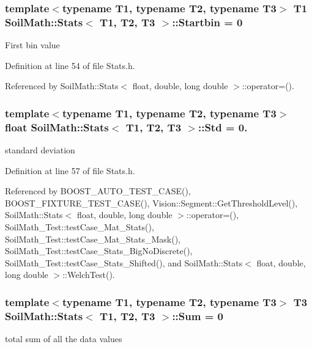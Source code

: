 \subsubsection[{Startbin}]{\setlength{\rightskip}{0pt plus 5cm}template$<$typename T1, typename T2, typename T3$>$ T1 {\bf Soil\+Math\+::\+Stats}$<$ T1, T2, T3 $>$\+::Startbin = 0}\label{class_soil_math_1_1_stats_acf54f4a105482109ebc884c8e56d0ba9}
First bin value 

Definition at line 54 of file Stats.\+h.



Referenced by Soil\+Math\+::\+Stats$<$ float, double, long double $>$\+::operator=().

\hypertarget{class_soil_math_1_1_stats_a6af590b7d033d882d5428c0d7a1f5e59}{}
\subsubsection[{Std}]{\setlength{\rightskip}{0pt plus 5cm}template$<$typename T1, typename T2, typename T3$>$ float {\bf Soil\+Math\+::\+Stats}$<$ T1, T2, T3 $>$\+::Std = 0.}\label{class_soil_math_1_1_stats_a6af590b7d033d882d5428c0d7a1f5e59}
standard deviation 

Definition at line 57 of file Stats.\+h.



Referenced by B\+O\+O\+S\+T\+\_\+\+A\+U\+T\+O\+\_\+\+T\+E\+S\+T\+\_\+\+C\+A\+S\+E(), B\+O\+O\+S\+T\+\_\+\+F\+I\+X\+T\+U\+R\+E\+\_\+\+T\+E\+S\+T\+\_\+\+C\+A\+S\+E(), Vision\+::\+Segment\+::\+Get\+Threshold\+Level(), Soil\+Math\+::\+Stats$<$ float, double, long double $>$\+::operator=(), Soil\+Math\+\_\+\+Test\+::test\+Case\+\_\+\+Mat\+\_\+\+Stats(), Soil\+Math\+\_\+\+Test\+::test\+Case\+\_\+\+Mat\+\_\+\+Stats\+\_\+\+Mask(), Soil\+Math\+\_\+\+Test\+::test\+Case\+\_\+\+Stats\+\_\+\+Big\+No\+Discrete(), Soil\+Math\+\_\+\+Test\+::test\+Case\+\_\+\+Stats\+\_\+\+Shifted(), and Soil\+Math\+::\+Stats$<$ float, double, long double $>$\+::\+Welch\+Test().

\hypertarget{class_soil_math_1_1_stats_af326fa61048522fc146b799759e345f9}{}
\subsubsection[{Sum}]{\setlength{\rightskip}{0pt plus 5cm}template$<$typename T1, typename T2, typename T3$>$ T3 {\bf Soil\+Math\+::\+Stats}$<$ T1, T2, T3 $>$\+::Sum = 0}\label{class_soil_math_1_1_stats_af326fa61048522fc146b799759e345f9}
total sum of all the data values 

